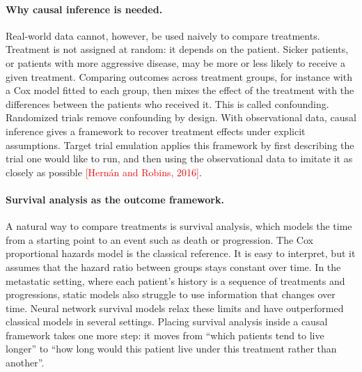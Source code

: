 \documentclass[a4paper,10pt]{article}
\newcommand{\todo}[1]{\textcolor{red}{#1}}
\begin{document}
\paragraph{Why causal inference is needed.}
Real-world data cannot, however, be used naively to compare treatments. Treatment is not assigned at random: it depends on the patient. Sicker patients, or patients with more aggressive disease, may be more or less likely to receive a given treatment. Comparing outcomes across treatment groups, for instance with a Cox model fitted to each group, then mixes the effect of the treatment with the differences between the patients who received it. This is called confounding. Randomized trials remove confounding by design. With observational data, causal inference gives a framework to recover treatment effects under explicit assumptions. Target trial emulation applies this framework by first describing the trial one would like to run, and then using the observational data to imitate it as closely as possible \todo{[Hern\'an and Robins, 2016]}.

\paragraph{Survival analysis as the outcome framework.}
A natural way to compare treatments is survival analysis, which models the time from a starting point to an event such as death or progression. The Cox proportional hazards model is the classical reference. It is easy to interpret, but it assumes that the hazard ratio between groups stays constant over time. In the metastatic setting, where each patient's history is a sequence of treatments and progressions, static models also struggle to use information that changes over time. Neural network survival models relax these limits and have outperformed classical models in several settings. Placing survival analysis inside a causal framework takes one more step: it moves from ``which patients tend to live longer'' to ``how long would this patient live under this treatment rather than another''.
\end{document}
